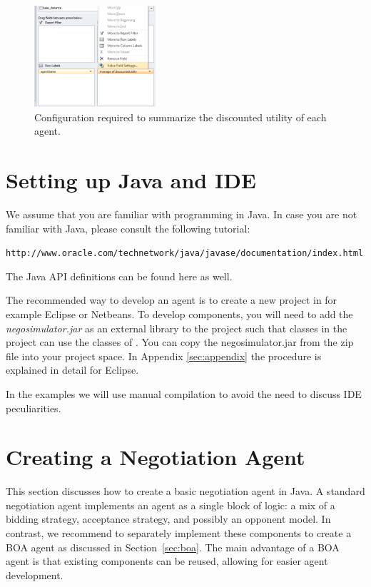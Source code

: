 \documentclass[]{article}
\begin{document}
\begin{figure}[htb]
	\centering
	\includegraphics[width=0.4\textwidth]{media/PivotTable.png}
\caption{Configuration required to summarize the discounted utility of each agent.}\label{fig:pivottable}
\end{figure}



\section{Setting up Java and IDE}
We assume that you are familiar with programming in Java. In case you are not familiar with Java, please consult the following tutorial: 

\texttt{http://www.oracle.com/technetwork/java/javase/documentation/index.html} 

The Java API definitions can be found here as well.

The recommended way to develop an agent is to create a new project in for example Eclipse or Netbeans. 
To develop \Genius components, you will need to add the \textit{negosimulator.jar} as an external library to the project such that classes in the project can use the classes of \Genius. You can copy the negosimulator.jar from the zip file into your project space.
In Appendix \ref{sec:appendix} the procedure is explained in detail for Eclipse.

In the examples we will use manual compilation to avoid the need to discuss IDE peculiarities.



\section{Creating a Negotiation Agent}
This section discusses how to create a basic negotiation agent in Java. A standard negotiation agent implements an agent as a single block of logic: a mix of a bidding strategy, acceptance strategy, and possibly an opponent model. In contrast, we recommend to separately implement these components to create a BOA agent as discussed in Section~\ref{sec:boa}. The main advantage of a BOA agent is that existing components can be reused, allowing for easier agent development.
\end{document}
